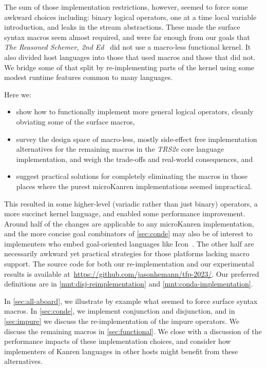 \documentclass[runningheads,natbib=false]{llncs}
\begin{document}
The sum of those implementation restrictions, however, seemed to force
some awkward choices including: binary logical operators, one at a
time local variable introduction, and leaks in the stream
abstractions. These made the surface syntax macros seem almost
required, and were far enough from our goals that \emph{The Reasoned
  Schemer, 2nd Ed}~\cite{friedman2018reasoned} did not use a
macro-less functional kernel. It also divided host languages into
those that used macros and those that did not. We bridge some of that
split by re-implementing parts of the kernel using some modest runtime
features common to many languages.

Here we:
\begin{itemize}
\item show how to functionally implement more general logical
  operators, cleanly obviating some of the surface macros,

\item survey the design space of macro-less, mostly side-effect free
  implementation alternatives for the remaining macros in the
  \emph{TRS2e} core language implementation, and weigh the trade-offs
  and real-world consequences, and

\item suggest practical solutions for completely eliminating the
  macros in those places where the purest microKanren
  implementations seemed impractical.

\end{itemize}

This resulted in some higher-level (variadic rather than just binary)
operators, a more succinct kernel language, and enabled some
performance improvement. Around half of the changes are applicable to
any microKanren implementation, and the more concise goal combinators
of \cref{sec:conde} may also be of interest to implementers who embed
goal-oriented languages like Icon~\cite{griswold1983icon}. The other
half are necessarily awkward yet practical strategies for those
platforms lacking macro support. The source code for both our
re-implementation and our experimental results is available
at~\url{https://github.com/jasonhemann/tfp-2023/}. Our preferred
definitions are in \cref{mnt:disj-reimplementation} and
\cref{mnt:conda-implementation}.

In \cref{sec:all-aboard}, we illustrate by example what seemed to
force surface syntax macros. In \cref{sec:conde}, we implement
conjunction and disjunction, and in \cref{sec:impure} we discuss the
re-implementation of the impure operators. We discuss the remaining
macros in \cref{sec:functional}. We close with a discussion of the
performance impacts of these implementation choices, and consider how
implementers of Kanren languages in other hosts might benefit from
these alternatives.
\end{document}
